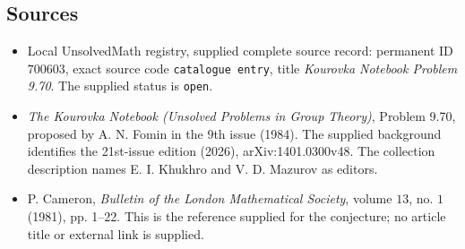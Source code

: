 \documentclass[11pt]{article}
\begin{document}
\subsection{Sources}
\begin{itemize}
\item Local UnsolvedMath registry, supplied complete source record: permanent ID \(700603\), exact source code \texttt{catalogue entry}, title \emph{Kourovka Notebook Problem 9.70}. The supplied status is \texttt{open}.
\item \emph{The Kourovka Notebook (Unsolved Problems in Group Theory)}, Problem 9.70, proposed by A. N. Fomin in the 9th issue (1984). The supplied background identifies the 21st-issue edition (2026), arXiv:1401.0300v48. The collection description names E. I. Khukhro and V. D. Mazurov as editors.
\item P. Cameron, \emph{Bulletin of the London Mathematical Society}, volume \(13\), no. \(1\) (1981), pp. 1--22. This is the reference supplied for the conjecture; no article title or external link is supplied.
\end{itemize}
\end{document}
